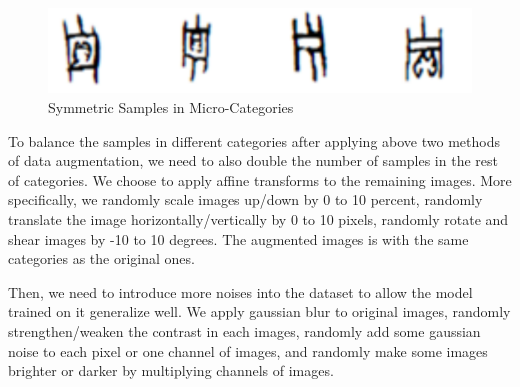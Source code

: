 \documentclass[journal]{IEEEtran}
\begin{document}
\begin{figure}[h]
	\centering
	\includegraphics[width=0.8\linewidth]{fig/observation-2.png}
	\caption{Symmetric Samples in Micro-Categories}
	\label{fig:sym-in}
\end{figure}

To balance the samples in different categories after applying above two methods of data augmentation, we need to also double the number of samples in the rest of categories.
We choose to apply affine transforms to the remaining images.
More specifically, we randomly scale images up/down by 0 to 10 percent, randomly translate the image horizontally/vertically by 0 to 10 pixels, randomly rotate and shear images by -10 to 10 degrees.
The augmented images is with the same categories as the original ones.

Then, we need to introduce more noises into the dataset to allow the model trained on it generalize well.
We apply gaussian blur to original images, randomly strengthen/weaken the contrast in each images, randomly add some gaussian noise to each pixel or one channel of images, and randomly make some images brighter or darker by multiplying channels of images.
\end{document}
